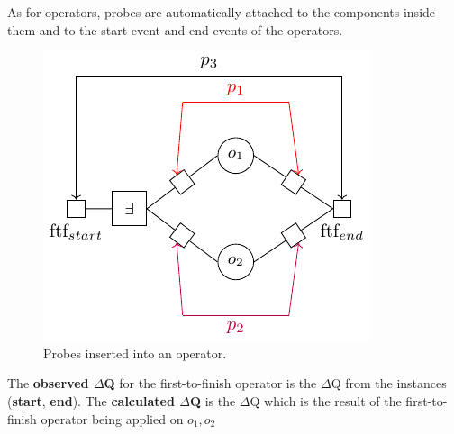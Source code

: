        As for operators, probes are automatically attached to the components inside them and to the start event and end events of the operators. 

       \begin{figure}[H]
           \begin{center}
                \includegraphics[scale = 1.3]{tikz/probe_2.pdf}
            \end{center}
            \label{fig:probes_op}
            \caption{Probes inserted into an operator.}
       \end{figure}
    
    The \textbf{observed $\Delta$Q} for the first-to-finish operator is the $\Delta$Q from the instances (\textbf{start}, \textbf{end}). The \textbf{calculated $\Delta$Q} is the $\Delta$Q which is the result of the first-to-finish operator being applied on $o_1, o_2$
        

